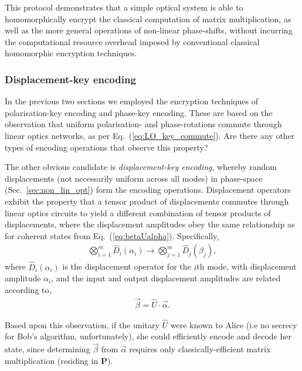 This protocol demonstrates that a simple optical system is able to homomorphically encrypt the classical computation of matrix multiplication, as well as the more general operations of non-linear phase-shifts, without incurring the computational resource overhead imposed by conventional classical homomorphic encryption techniques.


%
%

\subsubsection{Displacement-key encoding} \label{sec:disp_key_enc} 

In the previous two sections we employed the encryption techniques of polarisation-key encoding and phase-key encoding. These are based on the observation that uniform polarisation- and phase-rotations commute through linear optics networks, as per Eq.~(\ref{eq:LO_key_commute}). Are there any other types of encoding operations that observe this property?

The other obvious candidate is \textit{displacement-key encoding}, whereby random displacements (not necessarily uniform across all modes) in phase-space (Sec.~\ref{sec:non_lin_opt}) form the encoding operations. Displacement operators exhibit the property that a tensor product of displacements commutes through linear optics circuits to yield a different combination of tensor products of displacements, where the displacement amplitudes obey the same relationship as for coherent states from Eq.~(\ref{eq:betaUalpha}). Specifically,
\begin{align}
\bigotimes_{i=1}^m \hat{D}_i(\alpha_i) \to \bigotimes_{j=1}^m \hat{D}_j(\beta_j),
\end{align}
where $\hat{D}_i(\alpha_i)$ is the displacement operator for the $i$th mode, with displacement amplitude $\alpha_i$, and the input and output displacement amplitudes are related according to,
\begin{align}
\vec\beta = \hat{U}\cdot\vec\alpha.
\end{align}

Based upon this observation, if the unitary $\hat{U}$ were known to Alice (i.e no secrecy for Bob's algorithm, unfortunately), she could efficiently encode and decode her state, since determining $\vec\beta$ from $\vec\alpha$ requires only classically-efficient matrix multiplication (residing in \textbf{P}).

